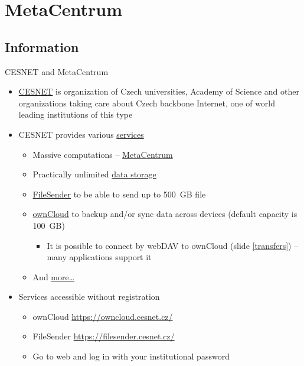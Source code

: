 \documentclass[compress, ucs, xelatex, 11pt, xcolor=svgnames,
  hyperref={
    bookmarks=true,
    unicode=true,
    colorlinks=true,
    pdftitle={Linux, command line and MetaCentrum},
    plainpages=false,
    pdfauthor={Vojtech Zeisek},
    pdfsubject={Course about use of Linux command line, writing shell scripts and using MetaCentrum of CESNET},
    pdfcreator={XeLaTeX},
    pdfkeywords={Linux, GNU, BASH, shell, command line, MetaCentrum},
    linkcolor=DarkRed,
    anchorcolor=DarkBlue,
    citecolor=Indigo,
    filecolor=NavyBlue,
    menucolor=DarkMagenta,
    urlcolor=DarkBlue,
    pdftex},
  url={hyphens, lowtilde} %
  ]{beamer}
\begin{document}
\section{MetaCentrum}

\subsection{Information}

\begin{frame}[allowframebreaks]{CESNET and MetaCentrum}
\begin{itemize}
  \item \href{https://www.cesnet.cz/?lang=en}{CESNET} is organization of Czech universities, Academy of Science and other organizations taking care about Czech backbone Internet, one of world leading institutions of this type
  \item CESNET provides various \href{https://www.cesnet.cz/services/?lang=en}{services}
  \begin{itemize}
    \item Massive computations -- \href{https://www.cesnet.cz/services/massive-computations-metacentrum/?lang=en}{MetaCentrum}
    \item Practically unlimited \href{https://www.cesnet.cz/services/data-storage/?lang=en}{data storage}
    \item \href{https://www.cesnet.cz/services/filesender/?lang=en}{FileSender} to be able to send up to 500~GB file
    \item \href{https://www.cesnet.cz/services/owncloud/?lang=en}{ownCloud} to backup and/or sync data across devices (default capacity is 100~GB)
    \begin{itemize}
      \item It is possible to connect by webDAV to ownCloud (slide \ref{transfers}) -- many applications support it
    \end{itemize}
    \item And \href{https://www.cesnet.cz/services/?lang=en}{more\ldots}
  \end{itemize}
  \item Services accessible without registration
  \begin{itemize}
    \item ownCloud \url{https://owncloud.cesnet.cz/}
    \item FileSender \url{https://filesender.cesnet.cz/}
    \item Go to web and log in with your institutional password
  \end{itemize}

\end{itemize}
\end{frame}
\end{document}
